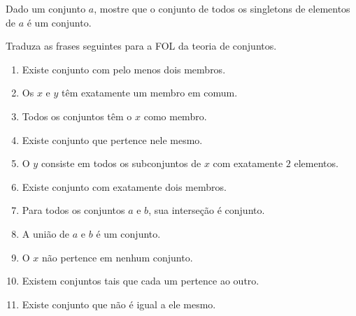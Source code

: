 \begin {exercise}
	Dado um conjunto $a$, mostre que o conjunto de todos os singletons de elementos de $a$ é um conjunto.
\end {exercise}

\begin {exercise}
	Traduza as frases seguintes para a FOL da teoria de conjuntos.
	\begin {enumerate}[(1)]
		\item Existe conjunto com pelo menos dois membros.
		\item Os $x$ e $y$ têm exatamente um membro em comum.
		\item Todos os conjuntos têm o $x$ como membro.
		\item Existe conjunto que pertence nele mesmo.
		\item O $y$ consiste em todos os subconjuntos de $x$ com exatamente $2$ elementos.
		\item Existe conjunto com exatamente dois membros.
		\item Para todos os conjuntos $a$ e $b$, sua interseção é conjunto.
		\item A união de $a$ e $b$ é um conjunto. 
		\item O $x$ não pertence em nenhum conjunto.
		\item Existem conjuntos tais que cada um pertence ao outro.
		\item Existe conjunto que não é igual a ele mesmo.
	\end {enumerate}
\end {exercise}
